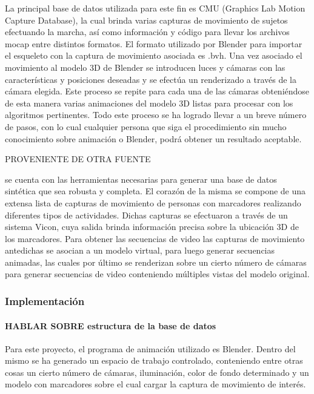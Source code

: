 La principal base de datos utilizada para este fin es CMU (Graphics Lab Motion Capture Database)\cite{CMU}, la cual brinda varias capturas de movimiento de sujetos efectuando la marcha, así como información y código para llevar los archivos mocap entre distintos formatos. El formato utilizado por Blender para importar el esqueleto con la captura de movimiento asociada es .bvh. Una vez asociado el movimiento al modelo 3D de Blender se introducen luces y cámaras con las características y posiciones deseadas y se efectúa un renderizado a través de la cámara elegida. Este proceso se repite para cada una de las cámaras obteniéndose de esta manera varias animaciones del modelo 3D listas para procesar con los algoritmos pertinentes. Todo este proceso se ha logrado llevar a un breve número de pasos, con lo cual cualquier persona que siga el procedimiento sin mucho conocimiento sobre animación o Blender, podrá obtener un resultado aceptable.

PROVENIENTE DE OTRA FUENTE

se cuenta con las herramientas necesarias para generar una base de datos sintética que sea robusta y completa. El corazón de la misma se compone de una extensa lista de capturas de movimiento de personas con marcadores realizando diferentes tipos de actividades. Dichas capturas se efectuaron a través de un sistema Vicon, cuya salida brinda información precisa sobre la ubicación 3D de los marcadores. Para obtener las secuencias de video las capturas de movimiento antedichas se asocian a un modelo virtual, para luego generar secuencias animadas, las cuales por último se renderizan sobre un cierto número de cámaras para generar secuencias de video conteniendo múltiples vistas del modelo original. 




\subsubsection{Implementación}



\paragraph{HABLAR SOBRE estructura de la base de datos}

Para este proyecto, el programa de animación utilizado es Blender. Dentro del mismo se ha generado un espacio de trabajo controlado, conteniendo entre otras cosas un cierto número de cámaras, iluminación, color de fondo determinado y un modelo con marcadores sobre el cual cargar la captura de movimiento de interés. \\

